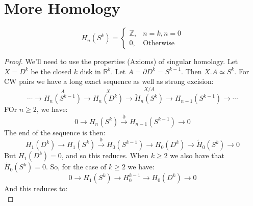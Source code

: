 \section{More Homology}
    \begin{theorem}
        \begin{equation}
            H_{n}(S^{k})=
            \begin{cases}
                \mathbb{Z},&n=k,n=0\\
                0,&\textrm{Otherwise}
            \end{cases}
        \end{equation}
    \end{theorem}
    \begin{proof}
        We'll need to use the properties (Axioms) of singular
        homology. Let $X=D^{k}$ be the closed $k$ disk in
        $\mathbb{R}^{k}$. Let $A=\partial{D}^{k}=S^{k-1}$. Then
        $X.A\simeq{S}^{k}$. For CW pairs we have a long exact sequence
        as well as strong excision:
        \begin{equation}
            \cdots\longrightarrow
            \overset{A}{H_{n}(S^{k-1})}\longrightarrow
            \overset{X}{H_{n}(D^{k})}\longrightarrow
            \overset{X/A}{\tilde{H}_{n}(S^{k})}\longrightarrow
            H_{n-1}(S^{k-1})\longrightarrow\cdots
        \end{equation}
        FOr $n\geq{2}$, we have:
        \begin{equation}
            0\longrightarrow{H}_{n}(S^{k})
            \overset{\partial}{\longrightarrow}H_{n-1}(S^{k-1})
            \longrightarrow{0}
        \end{equation}
        The end of the sequence is then:
        \begin{equation}
            H_{1}(D^{k})\longrightarrow
            H_{1}(S^{k})\overset{\partial}{\longrightarrow}
            H_{0}(S^{k-1})\longrightarrow{H}_{0}(D^{k})
            \longrightarrow\tilde{H}_{0}(S^{k})\longrightarrow{0}
        \end{equation}
        But $H_{1}(D^{k})=0$, and so this reduces. When $k\geq{2}$
        we also have that $\tilde{H}_{0}(S^{k})=0$. So, for the case
        of $k\geq{2}$ we have:
        \begin{equation}
            0\longrightarrow{H}_{1}(S^{k})\longrightarrow
            H_{0}^{k-1}\longrightarrow{H}_{0}(D^{k})\longrightarrow{0}
        \end{equation}
        And this reduces to:
        \begin{equation}

\end{equation}
\end{proof}
